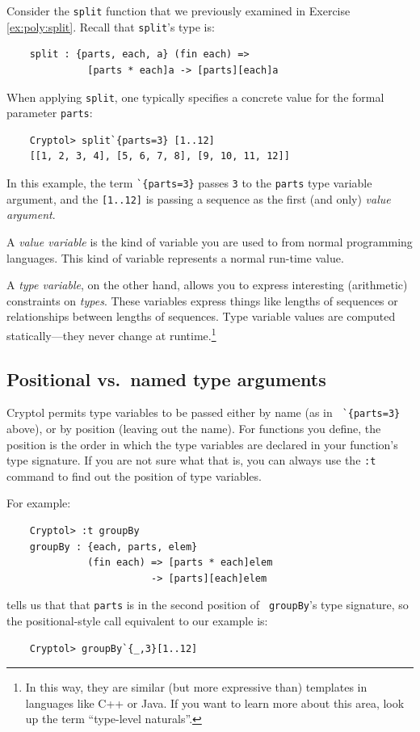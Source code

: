 Consider the \texttt{split} function that we previously examined in
Exercise \autoref{ex:poly:split}. Recall that \texttt{split}'s
type is:
\begin{verbatim}
    split : {parts, each, a} (fin each) =>
              [parts * each]a -> [parts][each]a
\end{verbatim}
When applying \texttt{split}, one typically specifies a concrete
value for the formal parameter \texttt{parts}:
\begin{Verbatim}
    Cryptol> split`{parts=3} [1..12]
    [[1, 2, 3, 4], [5, 6, 7, 8], [9, 10, 11, 12]]
\end{Verbatim}
In this example, the term {\tt\Verb|`{parts=3}|} passes \texttt{3} to
the \texttt{parts} type variable argument, and the \texttt{[1..12]} is
passing a sequence as the first (and only) \textit{value argument}.

A \emph{value variable} is the kind of variable you are used to from
normal programming languages.  This kind of variable represents a
normal run-time value.

A \emph{type variable}, on the other hand, allows you to express
interesting (arithmetic) constraints on \emph{types}. These variables
express things like lengths of sequences or relationships between
lengths of sequences.  Type variable values are computed
statically---they never change at runtime.\footnote{In this way,
  they are similar (but more expressive than) templates in languages
  like C++ or Java. If you want to learn more about this area, look up
  the term ``type-level naturals''.}

\subsection{Positional vs.\ named type
  arguments}\indTypePositionalArguments
\label{sec:positional-vs.-named}

Cryptol permits type variables to be passed either by name (as in {\tt
  \Verb|`{parts=3}|} above), or by position (leaving out the name).
For functions you define, the position is the order in which the type
variables are declared in your function's type signature. If you are
not sure what that is, you can always use the {\tt :t} command to find
out the position of type variables.

For example:
\begin{Verbatim}
    Cryptol> :t groupBy
    groupBy : {each, parts, elem}
              (fin each) => [parts * each]elem
                         -> [parts][each]elem
\end{Verbatim}
tells us that that {\tt parts} is in the second position of {\tt
  groupBy}'s type signature, so the positional-style call equivalent
to our example is:
\begin{Verbatim}
    Cryptol> groupBy`{_,3}[1..12]
\end{Verbatim}

